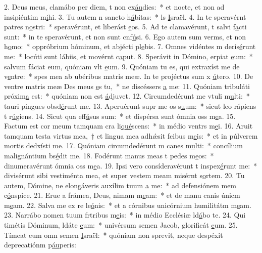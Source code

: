 2. Deus meus, clamábo per diem, t non ex\uline{áu}dies:~* et nocte, et non ad insipiéntim m\uline{i}hi.
3. Tu autem n sancto h\uline{á}bitas:~* ls \uline{I}sraël.
4. In te speravérnt patres n\uline{o}stri:~* speravérunt, et liberást \uline{e}os.
5. Ad te clamavérunt, t salvi f\uline{a}cti sunt:~* in te speravérunt, et non sunt cnf\uline{ú}si.
6. Ego autem sum verms, et non h\uline{o}mo:~* oppróbrium hóminum, et abjécti pl\uline{e}bis.
7. Omnes vidéntes m deris\uline{é}runt me:~* locúti sunt lábiis, et movérnt c\uline{a}put.
8. Sperávit in Dómino, erpiat \uline{e}um:~* salvum fáciat eum, quóniam vlt \uline{e}um.
9. Quóniam tu es, qui extraxíst me de v\uline{e}ntre:~* spes mea ab ubéribus matris meæ. In te projéctus sum x \uline{ú}tero.
10. De ventre matris meæ Des meus \uline{e}s tu,~* ne discéssers \uline{a} me:
11. Quóniam tribuláti próxim\uline{a} est:~* quóniam non est  \uline{á}djuvet.
12. Circumdedérunt me vtuli m\uline{u}lti:~* tauri pingues obsd\uline{é}runt me.
13. Aperuérunt supr me os s\uline{u}um:~* sicut leo rápiens t r\uline{ú}giens.
14. Sicut qua eff\uline{ú}sus sum:~* et dispérsa sunt ómnia oss m\uline{e}a.
15. Factum est cor meum tamquam cra li\uline{qué}scens:~* in médio ventrs m\uline{e}i.
16. Aruit tamquam testa virtus mea,~† et lingua mea adhǽsit fcibus m\uline{e}is:~* et in púlverem mortis dedx\uline{í}sti me.
17. Quóniam circumdedérunt m canes m\uline{u}lti:~* concílium malignántium bs\uline{é}dit me.
18. Fodérunt manus meas t pedes m\uline{e}os:~* dinumeravérunt ómnia oss m\uline{e}a.
19. Ipsi vero consíderavérunt t inspex\uline{é}runt me:~* divisérunt sibi vestiménta mea, et super vestem meam misérnt s\uline{o}rtem.
20. Tu autem, Dómine, ne elongáveris auxílim tuum \uline{a} me:~* ad defensiónem mem c\uline{ó}nspice.
21. Erue a frámea, Deus, nimam m\uline{e}am:~* et de manu canis únicm m\uline{e}am.
22. Salva me ex re le\uline{ó}nis:~* et a córnibus unicórnium humilitátm m\uline{e}am.
23. Narrábo nomen tuum frtribus m\uline{e}is:~* in médio Ecclésiæ ld\uline{á}bo te.
24. Qui timétis Dóminum, ldáte \uline{e}um:~* univérsum semen Jacob, glorificát \uline{e}um.
25. Tímeat eum omn semen \uline{I}sraël:~* quóniam non sprevit, neque despéxit deprecatiónm p\uline{áu}peris:
